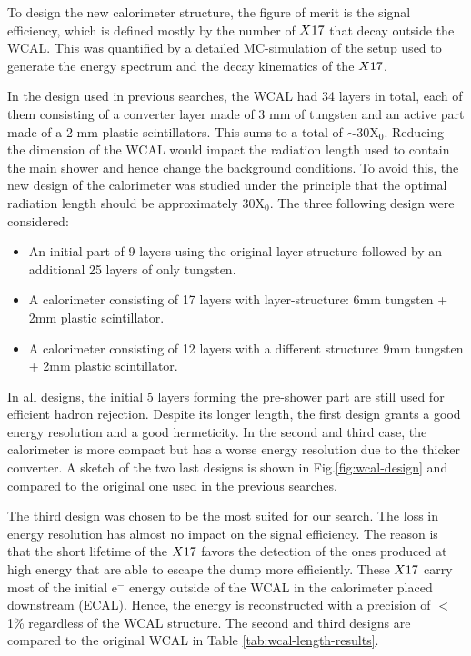 To design the new calorimeter structure, the figure of merit is the signal efficiency, which is defined mostly by the number of $X17$ that decay outside the WCAL. This was quantified by a detailed MC-simulation of the setup used to generate the energy spectrum and the decay kinematics of the $X17$.

In the design used in previous searches, the WCAL had 34 layers in total, each of them consisting of a converter layer made of 3 mm of tungsten and an active part made of a 2 mm plastic scintillators. This sums to a total of $\sim$30X$_0$. Reducing the dimension of the WCAL would impact the radiation length used to contain the main shower and hence change the background conditions. To avoid this, the new design of the calorimeter was studied under the principle that the optimal radiation length should be approximately 30X$_0$. The three following design were considered:

\begin{itemize}
\item An initial part of 9 layers using the original layer structure followed by an additional 25 layers of only tungsten.
\item A calorimeter consisting of 17 layers with layer-structure: 6mm tungsten + 2mm plastic scintillator.
\item A calorimeter consisting of 12 layers with a different structure: 9mm tungsten + 2mm plastic scintillator.
\end{itemize}

In all designs, the initial 5 layers forming the pre-shower part are still used for efficient hadron rejection. Despite its longer length, the first design grants a good energy resolution and a good hermeticity. In the second and third case, the calorimeter is more compact but has a worse energy resolution due to the thicker converter. A sketch of the two last designs is shown in Fig.\ref{fig:wcal-design} and compared to the original one used in the previous searches.

The third design was chosen to be the most suited for our search. The loss in energy resolution has almost no impact on the signal efficiency. The reason is that the short lifetime of the $X17$ favors the detection of the ones produced at high energy that are able to escape the dump more efficiently. These $X17$ carry most of the initial e$^-$ energy outside of the WCAL in the calorimeter placed downstream (ECAL). Hence, the energy is reconstructed with a precision of $<$1\% regardless of the WCAL structure. The second and third designs are compared to the original WCAL in Table \ref{tab:wcal-length-results}.

